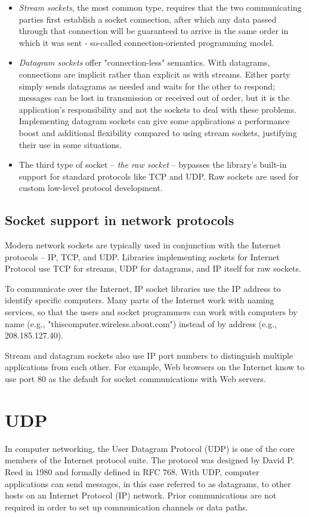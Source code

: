 \documentclass[a4paper,12pt]{article}
\begin{document}
    \begin{itemize}
        \item \textit{Stream sockets}, the most common type, requires that the two communicating parties first establish a socket connection, after which any data passed through that connection will be guaranteed to arrive in the same order in which it was sent - so-called connection-oriented programming model.
        \item \textit{Datagram sockets} offer "connection-less" semantics. With datagrams, connections are implicit rather than explicit as with streams. Either party simply sends datagrams as needed and waits for the other to respond; messages can be lost in transmission or received out of order, but it is the application's responsibility and not the sockets to deal with these problems. Implementing datagram sockets can give some applications a performance boost and additional flexibility compared to using stream sockets, justifying their use in some situations.
        \item The third type of socket -- \textit{the raw socket} -- bypasses the library's built-in support for standard protocols like TCP and UDP. Raw sockets are used for custom low-level protocol development.
    \end{itemize}
    
    \subsection{Socket support in network protocols}
    Modern network sockets are typically used in conjunction with the Internet protocols -- IP, TCP, and UDP. Libraries implementing sockets for Internet Protocol use TCP for streams, UDP for datagrams, and IP itself for raw sockets.
    
    
    To communicate over the Internet, IP socket libraries use the IP address to identify specific computers. Many parts of the Internet work with naming services, so that the users and socket programmers can work with computers by name (e.g., "thiscomputer.wireless.about.com") instead of by address (e.g., 208.185.127.40).
    
    
    Stream and datagram sockets also use IP port numbers to distinguish multiple applications from each other. For example, Web browsers on the Internet know to use port 80 as the default for socket communications with Web servers.
    
    
    \section{UDP}
    In computer networking, the User Datagram Protocol (UDP) is one of the core members of the Internet protocol suite. The protocol was designed by David P. Reed in 1980 and formally defined in RFC 768. With UDP, computer applications can send messages, in this case referred to as datagrams, to other hosts on an Internet Protocol (IP) network. Prior communications are not required in order to set up communication channels or data paths.
\end{document}
